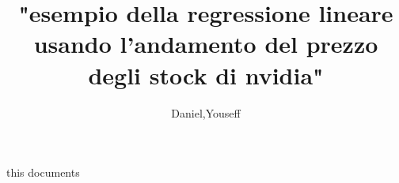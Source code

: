 \documentclass[12pt]{article}
\author{Daniel,Youseff}
\title{"esempio della regressione lineare usando l'andamento del prezzo degli stock di nvidia"}
\begin{document}
this documents
\end{document}
